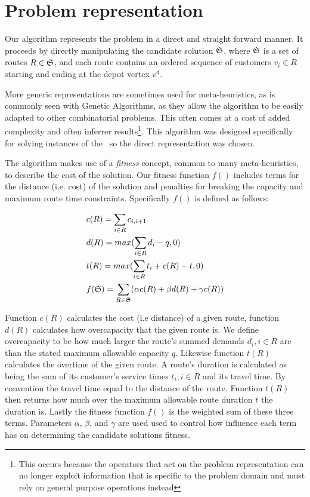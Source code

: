 \section{Problem representation}
\label{sec:problemrepresentation}

Our algorithm represents the problem in a direct and straight forward manner. It proceeds by directly manipulating the candidate solution $\mathfrak{S}$, where $\mathfrak{S}$ is a set of routes $R \in \mathfrak{S}$, and each route contains an ordered sequence of customers $v_i \in R$ starting and ending at the depot vertex $v^d$.


More generic representations are sometimes used for meta-heuristics, as is commonly seen with Genetic Algorithms, as they allow the algorithm to be easily adapted to other combinatorial problems. This often comes at a cost of added complexity and often inferrer results\footnote{This occurs because the operators that act on the problem representation can no longer exploit information that is specific to the problem domain and must rely on general purpose operations instead}. This algorithm was designed specifically for solving instances of the \VRP\ so the direct representation was chosen. 

The algorithm makes use of a \emph{fitness} concept, common to many meta-heuristics, to describe the cost of the solution. Our fitness function $f()$ includes terms for the distance (i.e. cost) of the solution and penalties for breaking the capacity and maximum route time constraints. Specifically $f()$ is defined as follows:

\begin{align}
   & c(R) = \sum_{i \in R} c_{i, i+1} \\
   & d(R) = max( \sum_{i \in R} d_i - q, 0 )  \\
   & t(R) = max( \sum_{i \in R} t_i + c(R) - t, 0 )  \\
   & f(\mathfrak{S}) = \sum_{R \in \mathfrak{S}} (\alpha c(R) + \beta d(R) + \gamma c(R))
\end{align}

Function $c(R)$ calculates the cost (i.e distance) of a given route, function $d(R)$ calculates how overcapacity that the given route is. We define overcapacity to be how much larger the route's summed demands $d_i, i \in R$ are than the stated maximum allowable capacity $q$. Likewise function $t(R)$ calculates the overtime of the given route. A route's duration is calculated as being the sum of its customer's service times $t_i, i \in R$ and its travel time. By convention the travel time equal to the distance of the route. Function $t(R)$ then returns how much over the maximum allowable route duration $t$ the duration is. Lastly the fitness function $f()$ is the weighted sum of these three terms. Parameters $\alpha$, $\beta$, and $\gamma$ are used  used to control how influence each term has on determining the candidate solutions fitness.

